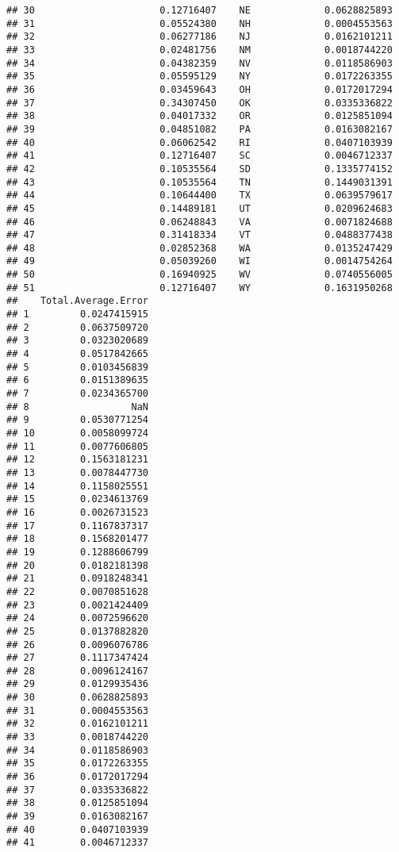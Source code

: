 \documentclass{article}\usepackage[]{graphicx}\usepackage[]{color}
\makeatletter
\newenvironment{kframe}{%
 \def\at@end@of@kframe{}%
 \ifinner\ifhmode%
  \def\at@end@of@kframe{\end{minipage}}%
  \begin{minipage}{\columnwidth}%
 \fi\fi%
 \def\FrameCommand##1{\hskip\@totalleftmargin \hskip-\fboxsep
 \colorbox{shadecolor}{##1}\hskip-\fboxsep
     \hskip-\linewidth \hskip-\@totalleftmargin \hskip\columnwidth}%
 \MakeFramed {\advance\hsize-\width
   \@totalleftmargin\z@ \linewidth\hsize
   \@setminipage}}%
 {\par\unskip\endMakeFramed%
 \at@end@of@kframe}
\newenvironment{knitrout}{}{} %
\makeatother
\begin{document}
\begin{knitrout}
\begin{kframe}
\begin{verbatim}
## 30                      0.12716407    NE             0.0628825893
## 31                      0.05524380    NH             0.0004553563
## 32                      0.06277186    NJ             0.0162101211
## 33                      0.02481756    NM             0.0018744220
## 34                      0.04382359    NV             0.0118586903
## 35                      0.05595129    NY             0.0172263355
## 36                      0.03459643    OH             0.0172017294
## 37                      0.34307450    OK             0.0335336822
## 38                      0.04017332    OR             0.0125851094
## 39                      0.04851082    PA             0.0163082167
## 40                      0.06062542    RI             0.0407103939
## 41                      0.12716407    SC             0.0046712337
## 42                      0.10535564    SD             0.1335774152
## 43                      0.10535564    TN             0.1449031391
## 44                      0.10644400    TX             0.0639579617
## 45                      0.14489181    UT             0.0209624683
## 46                      0.06248843    VA             0.0071824688
## 47                      0.31418334    VT             0.0488377438
## 48                      0.02852368    WA             0.0135247429
## 49                      0.05039260    WI             0.0014754264
## 50                      0.16940925    WV             0.0740556005
## 51                      0.12716407    WY             0.1631950268
##    Total.Average.Error
## 1         0.0247415915
## 2         0.0637509720
## 3         0.0323020689
## 4         0.0517842665
## 5         0.0103456839
## 6         0.0151389635
## 7         0.0234365700
## 8                  NaN
## 9         0.0530771254
## 10        0.0058099724
## 11        0.0077606805
## 12        0.1563181231
## 13        0.0078447730
## 14        0.1158025551
## 15        0.0234613769
## 16        0.0026731523
## 17        0.1167837317
## 18        0.1568201477
## 19        0.1288606799
## 20        0.0182181398
## 21        0.0918248341
## 22        0.0070851628
## 23        0.0021424409
## 24        0.0072596620
## 25        0.0137882820
## 26        0.0096076786
## 27        0.1117347424
## 28        0.0096124167
## 29        0.0129935436
## 30        0.0628825893
## 31        0.0004553563
## 32        0.0162101211
## 33        0.0018744220
## 34        0.0118586903
## 35        0.0172263355
## 36        0.0172017294
## 37        0.0335336822
## 38        0.0125851094
## 39        0.0163082167
## 40        0.0407103939
## 41        0.0046712337

\end{verbatim}
\end{kframe}
\end{knitrout}
\end{document}
